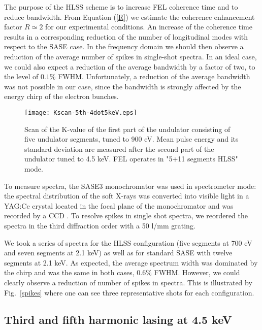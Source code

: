 \documentclass[aps,prl,preprint,groupedaddress,preprintnumbers]{revtex4}
\begin{document}
The purpose of the HLSS scheme is to increase FEL coherence time and to reduce bandwidth. From Equation
(\ref{R}) we estimate the coherence enhancement factor $R \simeq 2$ for our experimental conditions.
An increase of the
coherence time results in a corresponding reduction of the number of longitudinal modes with respect to the
SASE case. In the frequency domain we should then observe a reduction of the average number of spikes in single-shot
spectra. In an ideal case, we could also expect a reduction of the average bandwidth by a factor of two, to
the level of $0.1\%$ FWHM. Unfortunately, a reduction of the average bandwidth was not possible in our case,
since the bandwidth is strongly affected by the energy chirp of the electron bunches.

\begin{figure}[tb]
\texttt{[image: Kscan-5th-4dot5keV.eps]}

\caption{\small Scan of the K-value of the first part of the undulator consisting of five undulator
segments, tuned to 900 eV. Mean pulse energy and its standard deviation are
measured after the second part of the undulator tuned to 4.5 keV. FEL operates in "5+11 segments HLSS" mode.
}

\label{K-scan-5th}
\end{figure}


To measure spectra, the SASE3 monochromator \cite{spectrometer} was used in spectrometer mode: the spectral
distribution of the soft X-rays was converted into visible light in a YAG:Ce crystal located in the focal
plane of the monochromator and was recorded by a CCD \cite{phot-diag}. To resolve spikes in single shot spectra, we reordered
the spectra in the third diffraction order with a 50 l/mm grating.


We took a series of spectra for the HLSS configuration (five segments at 700 eV and seven segments at 2.1 keV) as
well as for standard SASE with twelve segments at 2.1 keV. As expected, the average spectrum width was
dominated by the chirp and was the same
in both cases, $0.6\%$ FWHM. However, we could clearly observe a reduction of number of spikes in spectra.
This is illustrated by Fig.~\ref{spikes} where one can see three representative shots for each configuration.


\subsection{Third and fifth harmonic lasing at 4.5 keV}
\end{document}
